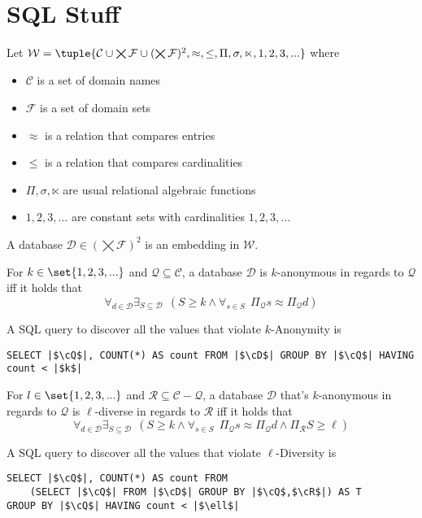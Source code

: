 \documentclass[12pt]{llncs}
\DeclarePairedDelimiter\set\{\}
\DeclarePairedDelimiter\tuple()
\newcommand{\eqq}{\approx}
\newcommand{\Proj}[1]{\Pi_{#1}}
\newcommand{\cC}{\mathcal{C}}
\newcommand{\cD}{\mathcal{D}}
\newcommand{\cF}{\mathcal{F}}
\newcommand{\cW}{\mathcal{W}}
\newcommand{\cQ}{\mathcal{Q}}
\newcommand{\cR}{\mathcal{R}}
\begin{document}

\section{SQL Stuff}
\begin{definition}
Let $\cW = \tuple{\cC \cup \bigtimes\cF \cup (\bigtimes\cF)^{2}, \eqq, \leq, \Pi, \sigma, \ltimes, 1, 2, 3, ...}$ where
\begin{itemize}
    \item $\cC$ is a set of domain names
    \item $\cF$ is a set of domain sets
    \item $\eqq$ is a relation that compares entries
    \item $\leq$ is a relation that compares cardinalities
    \item $\Pi, \sigma, \ltimes$ are usual relational algebraic functions
    \item $1, 2, 3, ...$ are constant sets with cardinalities $1, 2, 3, ...$
\end{itemize}
\end{definition}
A database $\cD \in (\bigtimes\cF)^{2}$ is an embedding in $\cW$.

\begin{definition}[$k$-Anonymity]
For $k \in \set{1,2,3,...}$ and $\cQ \subseteq \cC$, a database $\cD$ is $k$-anonymous in regards to $\cQ$ iff it holds that
\[
\forall_{d \in \cD}
\exists_{S \subseteq \cD}\ \
(
S \geq k \wedge
\forall_{s \in S}\ \
\Proj{\cQ} s \eqq \Proj{\cQ} d
)
\]
\end{definition}
A SQL query to discover all the values that violate $k$-Anonymity is
\begin{verbatim}
SELECT |$\cQ$|, COUNT(*) AS count FROM |$\cD$| GROUP BY |$\cQ$| HAVING count < |$k$|
\end{verbatim}

\begin{definition}
For $l \in \set{1,2,3,...}$ and $\cR \subseteq \cC - \cQ$, a database $\cD$ that's $k$-anonymous in regards to $\cQ$ is $\ell$-diverse in regards to $\cR$ iff it holds that
\[
\forall_{d \in \cD}
\exists_{S \subseteq \cD}\ \
(
S \geq k \wedge
\forall_{s \in S}\ \
\Proj{\cQ} s \eqq \Proj{\cQ} d
\wedge
\Proj{\cR} S \geq \ell
)
\]
\end{definition}
A SQL query to discover all the values that violate $\ell$-Diversity is
\begin{verbatim}
SELECT |$\cQ$|, COUNT(*) AS count FROM
    (SELECT |$\cQ$| FROM |$\cD$| GROUP BY |$\cQ$,$\cR$|) AS T
GROUP BY |$\cQ$| HAVING count < |$\ell$|
\end{verbatim}
\end{document}
